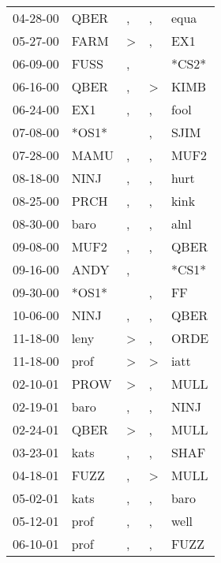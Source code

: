 \begin{supertabular}{lllll}
 04-28-00 &   QBER &                , &                , &   equa \\
 05-27-00 &   FARM &     \textgreater &                , &    EX1 \\
 06-09-00 &   FUSS &                , &                  &  *CS2* \\
 06-16-00 &   QBER &                , &     \textgreater &   KIMB \\
 06-24-00 &    EX1 &                , &                , &   fool \\
 07-08-00 &  *OS1* &                  &                , &   SJIM \\
 07-28-00 &   MAMU &                , &                , &   MUF2 \\
 08-18-00 &   NINJ &                , &                , &   hurt \\
 08-25-00 &   PRCH &                , &                , &   kink \\
 08-30-00 &   baro &                , &                , &   alnl \\
 09-08-00 &   MUF2 &                , &                , &   QBER \\
 09-16-00 &   ANDY &                , &                  &  *CS1* \\
 09-30-00 &  *OS1* &                  &                , &     FF \\
 10-06-00 &   NINJ &                , &                , &   QBER \\
 11-18-00 &   leny &     \textgreater &                , &   ORDE \\
 11-18-00 &   prof &     \textgreater &     \textgreater &   iatt \\
 02-10-01 &   PROW &     \textgreater &                , &   MULL \\
 02-19-01 &   baro &                , &                , &   NINJ \\
 02-24-01 &   QBER &     \textgreater &                , &   MULL \\
 03-23-01 &   kats &                , &                , &   SHAF \\
 04-18-01 &   FUZZ &                , &     \textgreater &   MULL \\
 05-02-01 &   kats &                , &                , &   baro \\
 05-12-01 &   prof &                , &                , &   well \\
 06-10-01 &   prof &                , &                , &   FUZZ \\

\end{supertabular}

